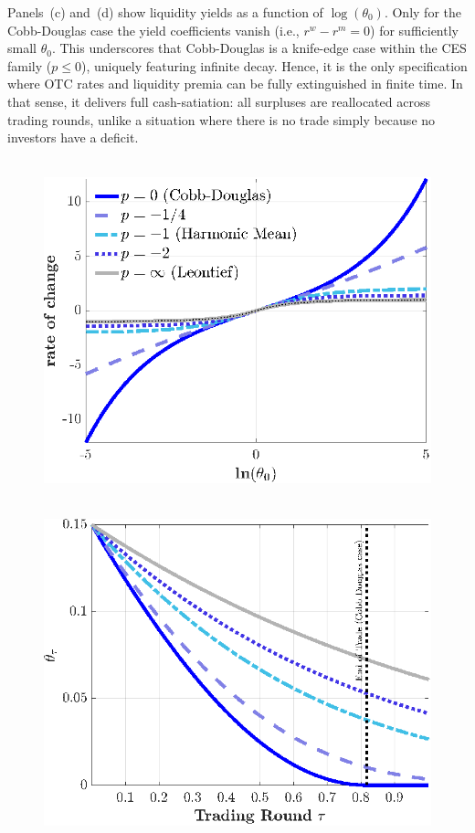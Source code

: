\documentclass[12pt,american,english,notitlepage]{article}
\begin{document}
Panels~(c) and~(d) show liquidity yields as a function of $\log(\theta_0)$. Only for the Cobb-Douglas case the yield coefficients vanish (i.e., $r^w - r^m = 0$) for sufficiently small $\theta_0$. This underscores that Cobb-Douglas is a knife-edge case within the CES family ($p \leq 0$), uniquely featuring infinite decay. Hence, it is the only specification where OTC rates and liquidity premia can be fully extinguished in finite time. In that sense, it delivers full cash-satiation: all surpluses are reallocated across trading rounds, unlike a situation where there is no trade simply because no investors have a deficit.
\begin{figure}[h!]
    \begin{minipage}[b]{.45\linewidth} 
         \\[4pt]
        \includegraphics[width=1\linewidth]{NewCode/Figures/F_growthrate.eps}
    \end{minipage}
    \hfill
    \begin{minipage}[b]{.45\linewidth}
     \\[4pt]
    \includegraphics[width=1\linewidth]{NewCode/Figures/F_trajectories.eps}
    \end{minipage}
    

\end{figure}
\end{document}
